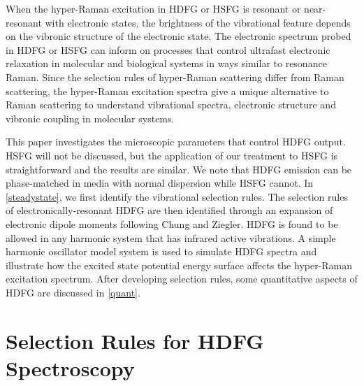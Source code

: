 \documentclass[aip, jcp, reprint, onecolumn, nofootinbib]{revtex4-2}
\begin{document}
When the hyper-Raman excitation in HDFG or HSFG is resonant or near-resonant with electronic states, the brightness of the vibrational feature depends on the vibronic structure of the electronic state.
The electronic spectrum probed in HDFG or HSFG can inform on processes that control ultrafast electronic relaxation in molecular and biological systems in ways similar to resonance Raman.\cite{Cho2001, Bredenbeck2015, Gaynor2018, Arsenault2021}
Since the selection rules of hyper-Raman scattering differ from Raman scattering, the hyper-Raman excitation spectra give a unique alternative to Raman scattering to understand vibrational spectra, electronic structure and vibronic coupling in molecular systems. \cite{Olson2018}

This paper investigates the microscopic parameters that control HDFG output. \cite{RN352, Bonn2024, McDonnell2024}
HSFG will not be discussed, but the application of our treatment to HSFG is straightforward and the results are similar.
We note that HDFG emission can be phase-matched in media with normal dispersion while HSFG cannot.\cite{RN279, RN278} 
In \autoref{steadystate}, we first identify the vibrational selection rules. 
The selection rules of electronically-resonant HDFG are then identified through an expansion of electronic dipole moments following Chung and Ziegler.\cite{Ziegler1988}
HDFG is found to be allowed in any harmonic system that has infrared active vibrations.
A simple harmonic oscillator model system is used to simulate HDFG spectra and illustrate how the excited state potential energy surface affects the hyper-Raman excitation spectrum.
After developing selection rules, some quantitative aspects of HDFG are discussed in \autoref{quant}.

\section{Selection Rules for HDFG Spectroscopy}\label{steadystate}
\end{document}
